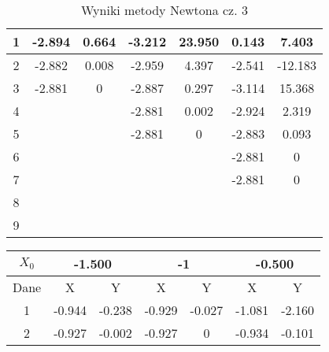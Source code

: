 \documentclass[a4paper, 11pt]{article}
\begin{document}
\begin{enumerate}
\begin{itemize}
\begin{table}[p]
\begin{tabular}{|c|c|c|c|c|c|c|}
\hline                                                       
1  & -2.894 & 0.664 & -3.212 & 23.950 & 0.143 & 7.403 \\  
\hline                                                       
2  & -2.882 & 0.008 & -2.959 & 4.397 & -2.541 & -12.183 \\
\hline                                                       
3  & -2.881 & 0 & -2.887 & 0.297 & -3.114 & 15.368 \\ 
\hline                                                       
4  &  &  & -2.881 & 0.002 & -2.924 & 2.319 \\   
\hline                                                       
5  &  &  & -2.881 & 0 & -2.883 & 0.093 \\   
\hline                                                       
6  &  &  &  &  & -2.881 &  0\\    
\hline                                                       
7  &  &  &  &  & -2.881 & 0 \\    
\hline                                                       
8  &  &  &  &  &  &  \\     
\hline                                                       
9  &  &  &  &  &  &  \\     
\hline                                                       
\end{tabular}                                                
\caption{Wyniki metody Newtona cz. 3}                        
\label{table:Wyniki metody Newtona cz. 3}                    
\end{table}                                                  
\begin{table}[p]                                                 
\centering                                                    
\begin{tabular}{|c|c|c|c|c|c|c|}                              
\hline                                                        
\( X_0 \)  & \multicolumn{2}{c|}{-1.500}& \multicolumn{2}{c|}{-1  }&\multicolumn{2}{c|}{-0.500 }\\  
\hline                                                        
Dane & X & Y & X & Y & X & Y \\                              
\hline                                                        
1  & -0.944 & -0.238 & -0.929 & -0.027 & -1.081 & -2.160 \\
\hline                                                        
2  & -0.927 & -0.002 & -0.927 & 0 & -0.934 & -0.101 \\

\end{tabular}
\end{table}
\end{itemize}
\end{enumerate}
\end{document}
